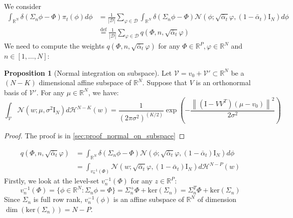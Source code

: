 \documentclass[a4paper,10pt]{article}
\theoremstyle{definition} %
\theoremstyle{definition} %
\newtheorem{proposition}[definition]{Proposition}
\theoremstyle{definition} %
\theoremstyle{definition} %
\newcommand{\R}{\mathbb{R}}
\renewcommand{\H}{\mathcal{H}}
\newcommand{\eqdef}{\stackrel{\mathrm{def}}{=}}
\newcommand{\Normal}[1]{\mathcal{N}\left( {#1} \right)}
\renewcommand{\ker}[1]{\mathrm{ker}\left( {#1} \right)}
\newcommand{\Id}{\mathrm{I}}
\newcommand{\norm}[1]{\left\| #1 \right \|}
\begin{document}
We consider
\begin{align*}
    \int_{\R^N} \delta(\Sigma_n\phi -\Phi) \pi_t(\phi) d\phi &= \frac{1}{|\mathcal{D}|} \sum_{\varphi \in \mathcal{D}} \int_{\R^N} \delta(\Sigma_n\phi -\Phi) \Normal{\phi; \sqrt{\bar \alpha_t} \varphi, (1-\bar\alpha_t) \Id_N} d\phi\\
    & \eqdef \frac{1}{|\mathcal{D}|} \sum_{\varphi \in \mathcal{D}} q(\Phi, n, \sqrt{\bar\alpha_t}\varphi)
\end{align*}
We need to compute the weights $q(\Phi, n, \sqrt{\bar\alpha_t}\varphi)$ for any $\Phi \in \R^P, \varphi \in \R^N$ and $n \in [1, \dots, N]$: 

\begin{proposition}[Normal integration on subspace]\label{propr:normal_on_subspace}
    Let $\mathcal{V} = v_0 + \mathcal{V'} \subset \R^N$ be a $(N - K)$ dimensional affine subspace of $\R^N$. Suppose that  $V$ is an orthonormal basis of $\mathcal{V'}$. For any $\mu \in \R^N$, we have:
    \begin{equation*}
        \int_{\mathcal{V}} \Normal{w; \mu, \sigma^2 \Id_{N}} d \mathcal{H}^{N - K}(w) = \frac{1}{(2 \pi \sigma^2)^{(K / 2)}} \exp \left( -\frac{\norm{(\Id - VV^T)(\mu - v_0)}^2}{2\sigma^2} \right)
    \end{equation*}
\end{proposition}
\begin{proof}
    The proof is in \cref{sec:proof_normal_on_subspace}
\end{proof}

\begin{align*}
    q(\Phi, n, \sqrt{\bar\alpha_t}\varphi) &= \int_{\R^N} \delta(\Sigma_n\phi -\Phi) \Normal{\phi; \sqrt{\bar \alpha_t} \varphi, (1-\bar\alpha_t) \Id_N} d\phi\\
    &= \int_{v_n^{-1}(\Phi)} \Normal{w; \sqrt{\bar \alpha_t }\varphi, (1-\bar\alpha_t) \Id_N} d \H^{N - P}(w) 
\end{align*}
Firstly, we look at the level-set $v_n^{-1}(\Phi)$ for any $z \in \R^P$:
\begin{equation*}
    v_n^{-1}(\Phi) = \{ \phi \in \R^N: \Sigma_n \phi = \Phi \} = \Sigma_n^+ \Phi + \ker{\Sigma_n}  = \Sigma_n^T \Phi + \ker{\Sigma_n}  
\end{equation*}
Since $\Sigma_n$ is full row rank, $v_n^{-1}(\phi)$ is an affine subspace of $\R^N$ of dimension $\dim(\ker{\Sigma_n}) = N - P$.  
\end{document}
